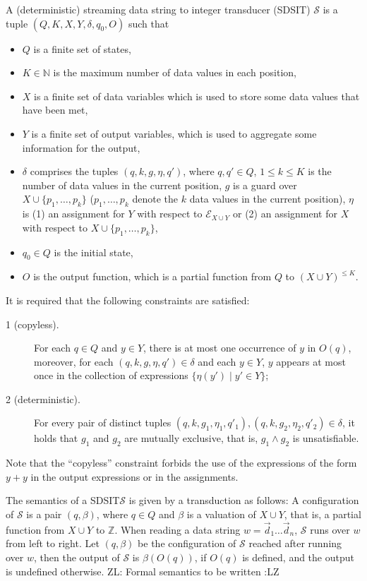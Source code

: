 \documentclass[runningheads,a4paper]{llncs}
\def\Ee{{\mathcal{E} }}
\def\Nn{{\mathbb{N} }}
\def\Ss{{\mathcal{S} }}
\def\Ii{{\mathbb{Z} }}
\newcommand{\zhilin}[1]{\color{cyan} {ZL: #1 :LZ} \color{black}}
\newcommand{\lei}[1]{\color{green} {LE: #1 :EL} \color{black}}
\newcommand{\SDSIT}{SDSIT}
\begin{document}
A (deterministic) streaming data string to integer transducer (SDSIT) $\Ss$ is a tuple $(Q, K, X, Y, \delta, q_0, O)$ such that 
\begin{itemize}
\item $Q$ is a finite set of states,
\item $K \in \Nn$ is the maximum number of data values in each position, 
\item $X$ is a finite set of data variables which is used to store some data values that have been met,
\item $Y$ is a finite set of output variables, which is used to aggregate some information for the output,
\item $\delta$ comprises the tuples $(q, k, g, \eta, q')$, where $q,q'\in Q $, $1 \le k \le K$ is the number of data values in the current position, $g$ is a guard over $X \cup \{p_1,\dots,p_k\}$ ($p_1,\dots,p_k$ denote the $k$ data values in the current position), $\eta$ is (1) an assignment for $Y$ with respect to $\Ee_{X \cup Y}$ or (2) an assignment for $X$ with respect to $X \cup \{p_1,\dots,p_k\}$, 
\item $q_0 \in Q$ is the initial state,
\item $O$ is the output function, which is a partial function from $Q$ to $(X \cup Y)^{\le K}$.
\end{itemize}
It is required that the following constraints are satisfied: 
\begin{description}
\item[1 (copyless).] For each $q \in Q$ and $y \in Y$, there is at most one occurrence of $y$ in $O(q)$, moreover, for each $(q,k, g, \eta, q') \in \delta$ and each $y \in Y$, $y$ appears at most once in the collection of expressions $\{\eta(y') \mid y' \in Y\}$; 
\item [2 (deterministic).] For every pair of distinct tuples $(q,k, g_1, \eta_1,q'_1), (q, k, g_2,\eta_2,q'_2) \in \delta$, it holds that $g_1$ and $g_2$ are mutually exclusive, that is, $g_1 \wedge g_2$ is unsatisfiable.
\end{description}
Note that the ``copyless'' constraint forbids the use of the expressions of the form $y+y$ in the output expressions or in the assignments.

The semantics of a \SDSIT $\Ss$  is given by a transduction as follows: A configuration of $\Ss$ is a pair $(q,\beta)$, where $q \in Q$ and $\beta$ is a valuation of $X \cup Y$, that is, a partial function from $X \cup Y$ to $\Ii$. When reading a data string $w=\vec{d}_1 \dots \vec{d}_n$, $\Ss$ runs over $w$ from left to right. Let $(q, \beta)$ be the configuration of $\Ss$ reached after running over $w$, then the output of $\Ss$ is $\beta(O(q))$, if $O(q)$ is defined, and the output is undefined otherwise. \zhilin{Formal semantics to be written}
\end{document}
